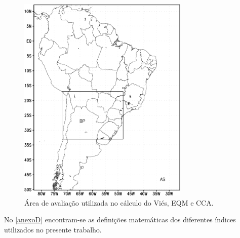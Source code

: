 \begin{figure}[!ht]
\centering
\includegraphics[height=10cm]{./figs/area_aval.png}
\caption{Área de avaliação utilizada no cálculo do Viés, EQM e CCA.}
\label{fig09}
\end{figure}

No \autoref{anexoD} encontram-se as definições matemáticas dos diferentes índices utilizados no presente trabalho.
